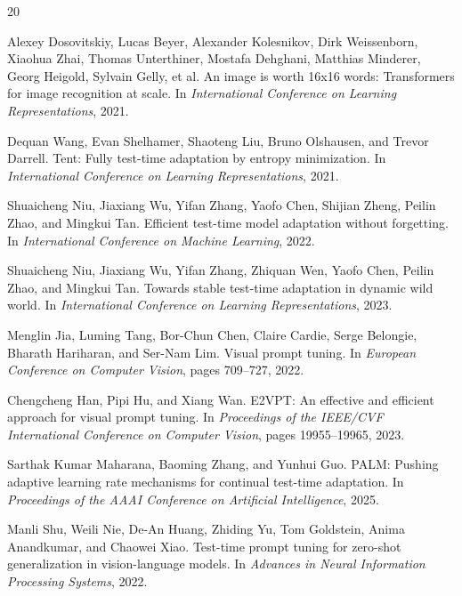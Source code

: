 \documentclass[11pt,a4paper]{article}
\begin{document}

\begin{thebibliography}{20}

Alexey Dosovitskiy, Lucas Beyer, Alexander Kolesnikov, Dirk Weissenborn, Xiaohua Zhai, Thomas Unterthiner, Mostafa Dehghani, Matthias Minderer, Georg Heigold, Sylvain Gelly, et al.
\newblock An image is worth 16x16 words: Transformers for image recognition at scale.
\newblock In \emph{International Conference on Learning Representations}, 2021.

Dequan Wang, Evan Shelhamer, Shaoteng Liu, Bruno Olshausen, and Trevor Darrell.
\newblock Tent: Fully test-time adaptation by entropy minimization.
\newblock In \emph{International Conference on Learning Representations}, 2021.

Shuaicheng Niu, Jiaxiang Wu, Yifan Zhang, Yaofo Chen, Shijian Zheng, Peilin Zhao, and Mingkui Tan.
\newblock Efficient test-time model adaptation without forgetting.
\newblock In \emph{International Conference on Machine Learning}, 2022.

Shuaicheng Niu, Jiaxiang Wu, Yifan Zhang, Zhiquan Wen, Yaofo Chen, Peilin Zhao, and Mingkui Tan.
\newblock Towards stable test-time adaptation in dynamic wild world.
\newblock In \emph{International Conference on Learning Representations}, 2023.

Menglin Jia, Luming Tang, Bor-Chun Chen, Claire Cardie, Serge Belongie, Bharath Hariharan, and Ser-Nam Lim.
\newblock Visual prompt tuning.
\newblock In \emph{European Conference on Computer Vision}, pages 709--727, 2022.

Chengcheng Han, Pipi Hu, and Xiang Wan.
\newblock E2VPT: An effective and efficient approach for visual prompt tuning.
\newblock In \emph{Proceedings of the IEEE/CVF International Conference on Computer Vision}, pages 19955--19965, 2023.

Sarthak Kumar Maharana, Baoming Zhang, and Yunhui Guo.
\newblock PALM: Pushing adaptive learning rate mechanisms for continual test-time adaptation.
\newblock In \emph{Proceedings of the AAAI Conference on Artificial Intelligence}, 2025.

Manli Shu, Weili Nie, De-An Huang, Zhiding Yu, Tom Goldstein, Anima Anandkumar, and Chaowei Xiao.
\newblock Test-time prompt tuning for zero-shot generalization in vision-language models.
\newblock In \emph{Advances in Neural Information Processing Systems}, 2022.


\end{thebibliography}
\end{document}
